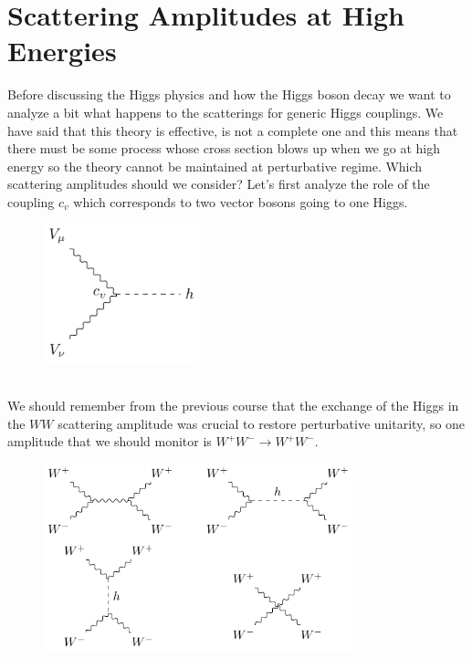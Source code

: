 \documentclass[../main.tex]{subfiles}
\begin{document}
\section{Scattering Amplitudes at High Energies}
Before discussing the Higgs physics and how the Higgs boson decay we want to analyze a bit what happens to the scatterings for generic Higgs couplings. We have said that this theory is effective, is not a complete one and this means that there must be some process whose cross section blows up when we go at high energy so the theory cannot be maintained at perturbative regime. Which scattering amplitudes should we consider? Let's first analyze the role of the coupling $c_v$ which corresponds to two vector bosons going to one Higgs.\\
\begin{figure}[h]
    \centering
    \includegraphics[width=0.4\textwidth]{Images/cvvv.pdf}
    \caption*{}
\end{figure}\\
We should remember from the previous course that the exchange of the Higgs in the $WW$ scattering amplitude was crucial to restore perturbative unitarity, so one amplitude that we should monitor is $W^+W^-\to W^+W^-$.\\
\begin{figure}[h]
    \centering
    \includegraphics[width=0.8\textwidth]{Images/wwww.pdf}
    \caption*{}
\end{figure}\\
\end{document}
